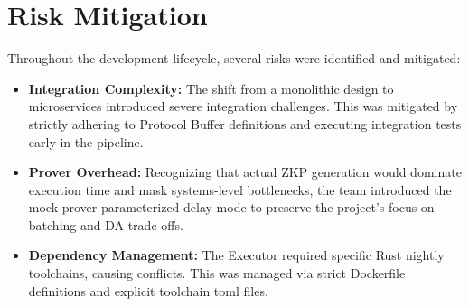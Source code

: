 \section{Risk Mitigation}
\label{sec:risk_mitigation}
Throughout the development lifecycle, several risks were identified and mitigated:
\begin{itemize}
    \item \textbf{Integration Complexity:} The shift from a monolithic design to microservices introduced severe integration challenges. This was mitigated by strictly adhering to Protocol Buffer definitions and executing integration tests early in the pipeline.
    \item \textbf{Prover Overhead:} Recognizing that actual ZKP generation would dominate execution time and mask systems-level bottlenecks, the team introduced the mock-prover parameterized delay mode to preserve the project's focus on batching and DA trade-offs.
    \item \textbf{Dependency Management:} The Executor required specific Rust nightly toolchains, causing conflicts. This was managed via strict Dockerfile definitions and explicit toolchain toml files.
\end{itemize}